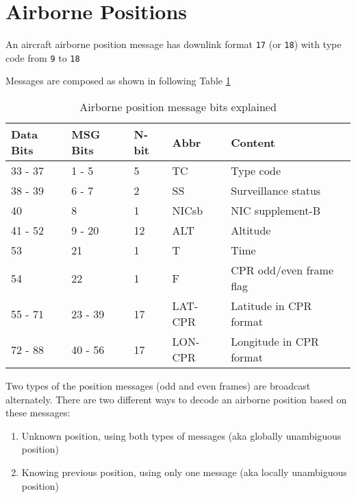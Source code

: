 \section{Airborne Positions}\label{airborne-positions}

An aircraft airborne position message has downlink format \texttt{17} (or \texttt{18}) with type code from \texttt{9} to \texttt{18}

Messages are composed as shown in following Table \ref{tb:adsb-pos-bits}

\begin{table}[!ht]
\centering
\caption{Airborne position message bits explained}
\label{tb:adsb-pos-bits}
\begin{tabular}{@{}lllll@{}}
\toprule
Data Bits & MSG Bits & N-bit & Abbr    & Content                 \\ \midrule
33 - 37   & 1 - 5    & 5     & TC      & Type code               \\
38 - 39   & 6 - 7    & 2     & SS      & Surveillance status     \\
40        & 8        & 1     & NICsb   & NIC supplement-B        \\
41 - 52   & 9 - 20   & 12    & ALT     & Altitude                \\
53        & 21       & 1     & T       & Time                    \\
54        & 22       & 1     & F       & CPR odd/even frame flag \\
55 - 71   & 23 - 39  & 17    & LAT-CPR & Latitude in CPR format  \\
72 - 88   & 40 - 56  & 17    & LON-CPR & Longitude in CPR format \\ \bottomrule
\end{tabular}
\end{table}

Two types of the position messages (odd and even frames) are broadcast alternately. There are two different ways to decode an airborne position based on these messages:

\begin{enumerate}
\def\labelenumi{\arabic{enumi}.}

\item
  Unknown position, using both types of messages (aka globally unambiguous position)
\item
  Knowing previous position, using only one message (aka locally unambiguous position)
\end{enumerate}

